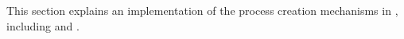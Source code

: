

\begin{comment}
\vspace{5pt}
\noindent{\bf Guest self-migration.~}  One of the key features of the host ABI
is that guest state can be programmatically read and recreated.
As a result, guests can checkpoint, migrate, and resume themselves in a new picoprocess,
potentially on a new host.  
Most of the library OS and application state are checkpointed simply 
by copying the contents of virtual memory into a file.
Checkpointing requires manually serializing a few key data structures
in {\tt libLinux} that are needed to resume the library OS from a checkpoint,
including the thread states, handle table, and memory mappings.  

Resuming from a checkpoint involves restoring these key data
structures (handles, thread register contexts, memory mappings), and re-loading memory
contents from the checkpoint.  Most additional data structures
in {\tt libLinux}, and all application data structures,
are reloaded at the virtual address as before the checkpoint and work without modification.
\end{comment}

\begin{comment}
When a new guest begins execution, an input argument to {\tt libLinux} indicates
whether control should be transferred to the Linux loader ({\tt ld.so}) to start a new application instance, 
or whether a checkpoint should be loaded instead.
\end{comment}



This section explains an implementation of the process creation mechanisms in \thelibos{},
including  and .




